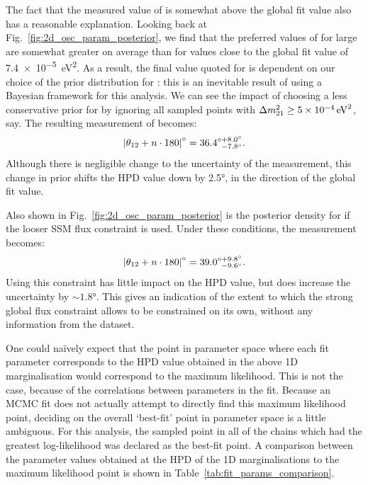 The fact that the measured value of \tonetwo{} is somewhat above the global fit value also has a reasonable explanation. Looking back at Fig.~\ref{fig:2d_osc_param_posterior}, we find that the preferred values of \tonetwo{} for large \dmsq{} are somewhat greater on average than for \dmsq{} values close to the global fit value of \SI{7.4e-5}{\eV\squared}. As a result, the final value quoted for \tonetwo{} is dependent on our choice of the prior distribution for \dmsq{}: this is an inevitable result of using a Bayesian framework for this analysis. We can see the impact of choosing a less conservative prior for \dmsq{} by ignoring all sampled points with $\dmsq{} \geq \SI{5e-4}{\eV\squared}$, say. The resulting measurement of \tonetwo{} becomes:
\begin{equation*}
    \left|\theta_{12}{} + n\cdot180\right|^{\circ} = 36.4^{\circ+8.0^{\circ}}_{\phantom{\circ}-7.8^{\circ}}.
\end{equation*}
Although there is negligible change to the uncertainty of the measurement, this change in prior shifts the HPD value down by \ang{2.5}, in the direction of the global fit value.

Also shown in Fig.~\ref{fig:2d_osc_param_posterior} is the posterior density for \tonetwo{} if the looser SSM flux constraint is used. Under these conditions, the measurement becomes:
\begin{equation*}
    \left|\theta_{12}{} + n\cdot180\right|^{\circ} = 39.0^{\circ+9.8^{\circ}}_{\phantom{\circ}-9.6^{\circ}}.
\end{equation*}
Using this constraint has little impact on the HPD value, but does increase the uncertainty by $\sim\ang{1.8}$. This gives an indication of the extent to which the strong global flux constraint allows \tonetwo{} to be constrained on its own, without any information from the dataset.

One could na\"{i}vely expect that the point in parameter space where each fit parameter corresponds to the HPD value obtained in the above 1D marginalisation would correspond to the maximum likelihood. This is not the case, because of the correlations between parameters in the fit. Because an MCMC fit does not actually attempt to directly find this maximum likelihood point, deciding on the overall `best-fit' point in parameter space is a little ambiguous. For this analysis, the sampled point in all of the chains which had the greatest log-likelihood was declared as the best-fit point. A comparison between the parameter values obtained at the HPD of the 1D marginalisations to the maximum likelihood point is shown in Table~\ref{tab:fit_params_comparison}.

